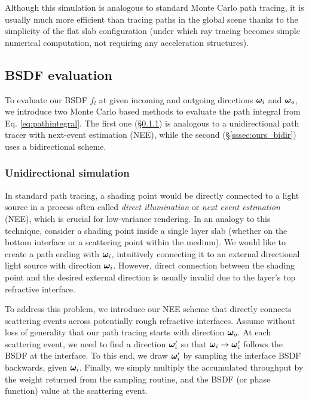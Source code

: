 Although this simulation is analogous to standard Monte Carlo path tracing, it is usually much more efficient than tracing paths in the global scene thanks to the simplicity of the flat slab configuration (under which ray tracing becomes simple numerical computation, not requiring any acceleration structures).

\subsection{BSDF evaluation}
\label{subsec:ours_eval}

To evaluate our BSDF $f_l$ at given incoming and outgoing directions $\bm{\omega}_i$ and $\bm{\omega}_o$, we introduce two Monte Carlo based methods to evaluate the path integral from Eq. \eqref{eq:pathintegral}.
The first one (\S\ref{sssec:ours_unidir}) is analogous to a unidirectional path tracer with next-event estimation (NEE), while the second (\S\ref{sssec:ours_bidir}) uses a bidirectional scheme.

\subsubsection{Unidirectional simulation}
\label{sssec:ours_unidir}

In standard path tracing, a shading point would be directly connected to a light source in a process often called \emph{direct illumination} or \emph{next event estimation} (NEE), which is crucial for low-variance rendering. In an analogy to this technique, consider a shading point inside a single layer slab (whether on the bottom interface or a scattering point within the medium). We would like to create a path ending with $\bm{\omega}_i$, intuitively connecting it to an external directional light source with direction $\bm{\omega}_i$. However, direct connection between the shading point and the desired external direction is usually invalid due to the layer's top refractive interface.

To address this problem, we introduce our NEE scheme that directly connects scattering events across potentially rough refractive interfaces.
Assume without loss of generality that our path tracing starts with direction $\bm{\omega}_o$.
At each scattering event, we need to find a direction $\bm{\omega}_i'$ so that $\bm{\omega}_i \to \bm{\omega}_i'$ follows the BSDF at the interface.
To this end, we draw $\bm{\omega}_i'$ by sampling the interface BSDF backwards, given $\bm{\omega}_i$.
Finally, we simply multiply the accumulated throughput by the weight returned from the sampling routine, and the BSDF (or phase function) value at the scattering event.

